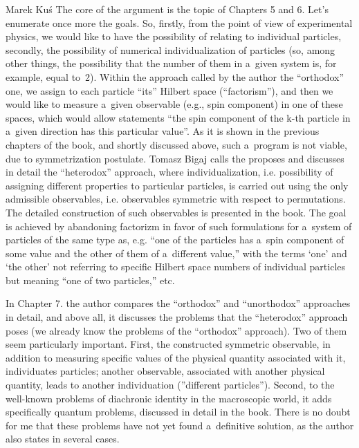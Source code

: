 \begin{newrevengenv}{Marek Kuś}
The core of the argument is the topic of Chapters 5 and 6. Let's enumerate once more the goals. So, firstly, from the point of view of experimental physics, we would like to have the possibility of relating to individual particles, secondly, the possibility of numerical individualization of particles (so, among other things, the possibility that the number of them in a~given system is, for example, equal to~2). Within the approach called by the author the ``orthodox'' one, we assign to each particle ``its'' Hilbert space (``factorism''), and then we would like to measure a~given observable (e.g., spin component) in one of these spaces, which would allow statements ``the spin component of the k-th particle in a~given direction has this particular value''. As it is shown in the previous chapters of the book, and shortly discussed above, such a~program is not viable, due to symmetrization postulate. Tomasz Bigaj calls the proposes and discusses in detail the ``heterodox'' approach, where individualization, i.e. possibility of assigning different properties to particular particles, is carried out using the only admissible observables, i.e. observables symmetric with respect to permutations. The detailed construction of such observables is presented in the book. The goal is achieved by abandoning factorizm in favor of such formulations for a~system of particles of the same type as, e.g. ``one of the particles has a~spin component of some value and the other of them of a~different value,'' with the terms ‘one' and ‘the other' not referring to specific Hilbert space numbers of individual particles but meaning ``one of two particles,'' etc.

In Chapter 7. the author compares the ``orthodox'' and ``unorthodox'' approaches in detail, and above all, it discusses the problems that the ``heterodox'' approach poses (we already know the problems of the ``orthodox'' approach). Two of them seem particularly important. First, the constructed symmetric observable, in addition to measuring specific values of the physical quantity associated with it, individuates particles; another observable, associated with another physical quantity, leads to another individuation (''different particles''). Second, to the well-known problems of diachronic identity in the macroscopic world, it adds specifically quantum problems, discussed in detail in the book. There is no doubt for me that these problems have not yet found a~definitive solution, as the author also states in several cases.


\end{newrevengenv}
